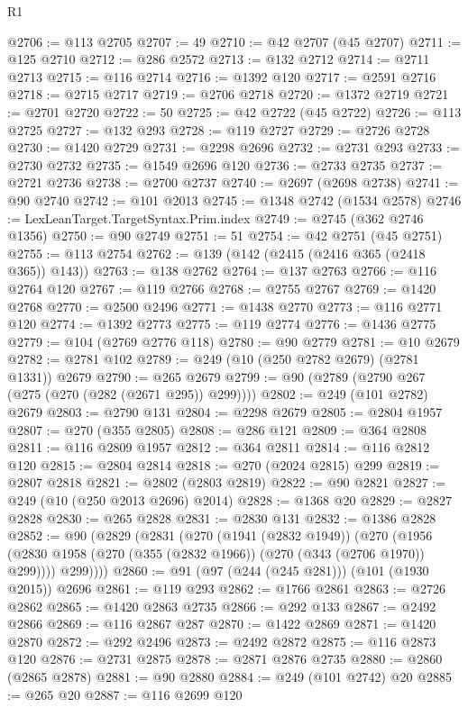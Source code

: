 \begin{lexlean}{R1}
\begin{coremodule}
@2706 := @113 @2705
@2707 := 49
@2710 := @42 @2707 (@45 @2707)
@2711 := @125 @2710
@2712 := @286 @2572
@2713 := @132 @2712
@2714 := @2711 @2713
@2715 := @116 @2714
@2716 := @1392 @120
@2717 := @2591 @2716
@2718 := @2715 @2717
@2719 := @2706 @2718
@2720 := @1372 @2719
@2721 := @2701 @2720
@2722 := 50
@2725 := @42 @2722 (@45 @2722)
@2726 := @113 @2725
@2727 := @132 @293
@2728 := @119 @2727
@2729 := @2726 @2728
@2730 := @1420 @2729
@2731 := @2298 @2696
@2732 := @2731 @293
@2733 := @2730 @2732
@2735 := @1549 @2696 @120
@2736 := @2733 @2735
@2737 := @2721 @2736
@2738 := @2700 @2737
@2740 := @2697 (@2698 @2738)
@2741 := @90 @2740
@2742 := @101 @2013
@2745 := @1348 @2742 (@1534 @2578)
@2746 := LexLeanTarget.TargetSyntax.Prim.index
@2749 := @2745 (@362 @2746 @1356)
@2750 := @90 @2749
@2751 := 51
@2754 := @42 @2751 (@45 @2751)
@2755 := @113 @2754
@2762 := @139 (@142 (@2415 (@2416 @365 (@2418 @365)) @143))
@2763 := @138 @2762
@2764 := @137 @2763
@2766 := @116 @2764 @120
@2767 := @119 @2766
@2768 := @2755 @2767
@2769 := @1420 @2768
@2770 := @2500 @2496
@2771 := @1438 @2770
@2773 := @116 @2771 @120
@2774 := @1392 @2773
@2775 := @119 @2774
@2776 := @1436 @2775
@2779 := @104 (@2769 @2776 @118)
@2780 := @90 @2779
@2781 := @10 @2679
@2782 := @2781 @102
@2789 := @249 (@10 (@250 @2782 @2679) (@2781 @1331)) @2679
@2790 := @265 @2679
@2799 := @90 (@2789 (@2790 @267 (@275 (@270 (@282 (@2671 @295)) @299))))
@2802 := @249 (@101 @2782) @2679
@2803 := @2790 @131
@2804 := @2298 @2679
@2805 := @2804 @1957
@2807 := @270 (@355 @2805)
@2808 := @286 @121
@2809 := @364 @2808
@2811 := @116 @2809 @1957
@2812 := @364 @2811
@2814 := @116 @2812 @120
@2815 := @2804 @2814
@2818 := @270 (@2024 @2815) @299
@2819 := @2807 @2818
@2821 := @2802 (@2803 @2819)
@2822 := @90 @2821
@2827 := @249 (@10 (@250 @2013 @2696) @2014)
@2828 := @1368 @20
@2829 := @2827 @2828
@2830 := @265 @2828
@2831 := @2830 @131
@2832 := @1386 @2828
@2852 := @90
    (@2829
      (@2831
        (@270
          (@1941 (@2832 @1949))
          (@270
            (@1956 (@2830 @1958 (@270 (@355 (@2832 @1966)) (@270 (@343 (@2706 @1970)) @299))))
            @299))))
@2860 := @91 (@97 (@244 (@245 @281))) (@101 (@1930 @2015)) @2696
@2861 := @119 @293
@2862 := @1766 @2861
@2863 := @2726 @2862
@2865 := @1420 @2863 @2735
@2866 := @292 @133
@2867 := @2492 @2866
@2869 := @116 @2867 @287
@2870 := @1422 @2869
@2871 := @1420 @2870
@2872 := @292 @2496
@2873 := @2492 @2872
@2875 := @116 @2873 @120
@2876 := @2731 @2875
@2878 := @2871 @2876 @2735
@2880 := @2860 (@2865 @2878)
@2881 := @90 @2880
@2884 := @249 (@101 @2742) @20
@2885 := @265 @20
@2887 := @116 @2699 @120

\end{coremodule}
\end{lexlean}
